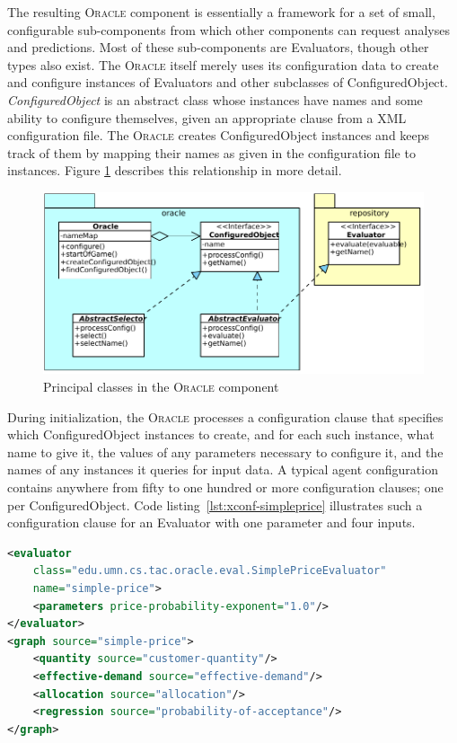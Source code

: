 \documentclass{article}
\begin{document}
The resulting \textsc{Oracle} component is essentially a framework for a set of small, configurable sub-components from which other components can request analyses and predictions.
Most of these sub-components are Evaluators, though other types also exist.
The \textsc{Oracle} itself merely uses its configuration data to create and configure instances of Evaluators and other subclasses of ConfiguredObject.
\emph{ConfiguredObject} is an abstract class whose instances have names and some ability to configure themselves, given an appropriate clause from a XML configuration file.
The \textsc{Oracle} creates ConfiguredObject instances and keeps track of them by mapping their names as given in the configuration file to instances.  Figure \ref{fig:oracle-classes} describes this relationship in more detail.

\begin{figure}[ht]
\centering
\includegraphics[width=\textwidth]{figures/oracle-classes}
\caption{\label{fig:oracle-classes}Principal classes in the \textsc{Oracle} component}
\end{figure}

During initialization, the \textsc{Oracle} processes a configuration clause that specifies which ConfiguredObject instances to create, and for each such instance, what name to give it, the values of any parameters necessary to configure it, and the names of any instances it queries for input data.
A typical agent configuration contains anywhere from fifty to one hundred or more configuration clauses; one per ConfiguredObject.
Code listing~\ref{lst:xconf-simpleprice} illustrates such a configuration clause for an Evaluator with one parameter and four inputs.

{\small
\begin{lstlisting}[language={XML},frame={single},
label={lst:xconf-simpleprice},caption={Configuration clause for a price
evaluator that uses one parameter and several inputs}]
<evaluator
    class="edu.umn.cs.tac.oracle.eval.SimplePriceEvaluator"
    name="simple-price">
    <parameters price-probability-exponent="1.0"/>
</evaluator>
<graph source="simple-price">
    <quantity source="customer-quantity"/>
    <effective-demand source="effective-demand"/>
    <allocation source="allocation"/>
    <regression source="probability-of-acceptance"/>
</graph>
\end{lstlisting}
}
\end{document}
